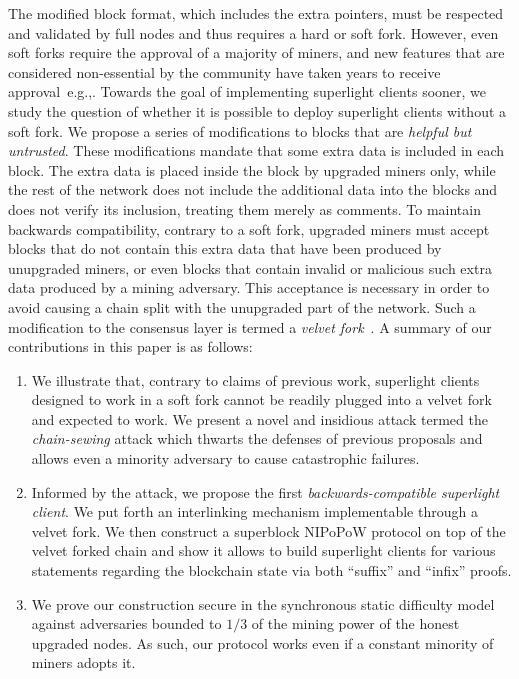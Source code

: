 The modified block format, which includes the extra pointers, must be respected
and validated by full nodes and thus requires a hard or soft fork. However, even soft forks require the approval of a majority of
miners, and new features that are considered non-essential by the community have
taken years to receive approval~e.g.,\cite{segwit}. Towards the goal of implementing
superlight clients sooner, we study the question of whether it is possible to
deploy superlight clients without a soft fork. We propose a series of
modifications to blocks that are \emph{helpful but untrusted}. These
modifications mandate that some extra data is included in each block. The extra
data is placed inside the block by upgraded miners only, while the rest of the
network does not include the additional data into the blocks and does not verify
its inclusion, treating them merely as comments. To maintain backwards
compatibility, contrary to a soft fork, upgraded miners must accept blocks that
do not contain this extra data that have been produced by unupgraded miners, or
even blocks that contain invalid or malicious such extra data produced by a
mining adversary. This acceptance is necessary in order to avoid causing a chain
split with the unupgraded part of the network. Such a modification to the
consensus layer is termed a \emph{velvet fork}~\cite{nipopows,velvet}.
A summary of our contributions in this paper is as follows:
\begin{enumerate}
  \item We illustrate that, contrary to claims of previous work, superlight
        clients designed to work in a soft fork cannot be readily plugged into a velvet fork and expected to work. We present a novel and insidious
        attack termed the \emph{chain-sewing} attack which thwarts the defenses of previous proposals and allows even a minority adversary to cause
        catastrophic failures.
  \item Informed by the attack, we propose the first \emph{backwards-compatible superlight client}. We put forth an interlinking mechanism implementable through a velvet fork. We then construct a superblock NIPoPoW protocol on top of the velvet forked chain and show it allows to build superlight clients for various statements regarding the blockchain state via both ``suffix'' and ``infix'' proofs.
  \item We prove our construction secure in the synchronous static difficulty model against adversaries bounded to $1/3$ of the mining power of the honest upgraded nodes. As such, our protocol works even if a constant minority of miners adopts it.
\end{enumerate}

